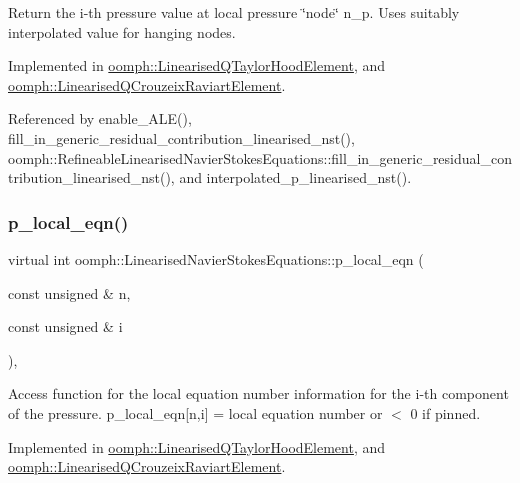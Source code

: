 Return the i-\/th pressure value at local pressure \char`\"{}node\char`\"{} n\+\_\+p. Uses suitably interpolated value for hanging nodes. 



Implemented in \hyperlink{classoomph_1_1LinearisedQTaylorHoodElement_a9f8724c0006b99cf422040d429033828}{oomph\+::\+Linearised\+Q\+Taylor\+Hood\+Element}, and \hyperlink{classoomph_1_1LinearisedQCrouzeixRaviartElement_a249f8ab0e96abdabb3f60488386ba55d}{oomph\+::\+Linearised\+Q\+Crouzeix\+Raviart\+Element}.



Referenced by enable\+\_\+\+A\+L\+E(), fill\+\_\+in\+\_\+generic\+\_\+residual\+\_\+contribution\+\_\+linearised\+\_\+nst(), oomph\+::\+Refineable\+Linearised\+Navier\+Stokes\+Equations\+::fill\+\_\+in\+\_\+generic\+\_\+residual\+\_\+contribution\+\_\+linearised\+\_\+nst(), and interpolated\+\_\+p\+\_\+linearised\+\_\+nst().

\mbox{\label{classoomph_1_1LinearisedNavierStokesEquations_a41fac6d78bdecf58d625ecbc95593a03}} 
\subsubsection{\texorpdfstring{p\+\_\+local\+\_\+eqn()}{p\_local\_eqn()}}
{\footnotesize\ttfamily virtual int oomph\+::\+Linearised\+Navier\+Stokes\+Equations\+::p\+\_\+local\+\_\+eqn (\begin{DoxyParamCaption}\item[{const unsigned \&}]{n,  }\item[{const unsigned \&}]{i }\end{DoxyParamCaption})\hspace{0.3cm}{\ttfamily [protected]}, {}}



Access function for the local equation number information for the i-\/th component of the pressure. p\+\_\+local\+\_\+eqn\mbox{[}n,i\mbox{]} = local equation number or $<$ 0 if pinned. 



Implemented in \hyperlink{classoomph_1_1LinearisedQTaylorHoodElement_add790a7adf9472c27b4da3c0f6c9e4a5}{oomph\+::\+Linearised\+Q\+Taylor\+Hood\+Element}, and \hyperlink{classoomph_1_1LinearisedQCrouzeixRaviartElement_adbf9ce1437bfaca4c7833713b2899706}{oomph\+::\+Linearised\+Q\+Crouzeix\+Raviart\+Element}.



